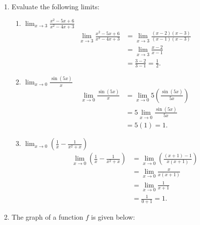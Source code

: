 \documentclass[12pt]{article}
\newcommand{\points}[1]{\marginpar{\hspace{24pt}[#1]}}
\newcommand{\di}{\displaystyle}
\begin{document}
\thispagestyle{fancy}

 \begin{enumerate}
 \item  Evaluate the following limits:
\begin{enumerate}
 \item $\di \lim_{x\to 3} \frac{x^2-5x+6}{x^2-4x+3}$\points{3} 
\begin{align*}
                   \lim_{x\to 3} \frac{x^2-5x+6}{x^2-4x+3} & = \lim_{x\to 3}\frac{(x-2)(x-3)}{(x-1)(x-3)}\\[10pt]
& = \lim_{x\to 3}\frac{x-2}{x-1}\\[10pt]
& = \frac{3-2}{3-1} = \frac{1}{2}.
                  \end{align*}



\bigskip

 \item  $\di \lim_{x\to 0}\frac{\sin(5x)}{x}$\points{3} 
\begin{align*}
                    \lim_{x\to 0}\frac{\sin(5x)}{x} & = \lim_{x\to 0}5\left(\frac{\sin(5x)}{5x}\right)\\[10pt]
 & = 5\lim_{x\to 0}\frac{\sin(5x)}{5x}\\[10pt]
 & = 5(1) = 1.
                   \end{align*}

\bigskip

 \item $\di \lim_{x\to 0}\left(\frac{1}{x}-\frac{1}{x^2+x}\right)$ \points{3} 
\begin{align*}
                    \lim_{x\to 0}\left(\frac{1}{x}-\frac{1}{x^2+x}\right) & = \lim_{x\to 0}\left(\frac{(x+1)-1}{x(x+1)}\right)\\[10pt]
& = \lim_{x\to 0}\frac{x}{x(x+1)}\\[10pt]
& = \lim_{x\to 0}\frac{1}{x+1}\\[5pt]
& = \frac{1}{0+1} = 1.
                   \end{align*}


\end{enumerate}
\newpage

\item The graph of a function $f$ is given below:


\end{enumerate}
\end{document}
